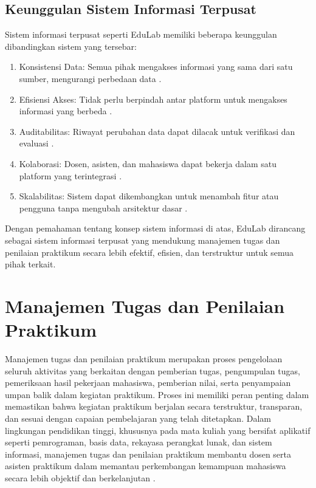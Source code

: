 \documentclass[12pt,a4paper,twoside]{report}
\begin{document}
\subsection{Keunggulan Sistem Informasi Terpusat}

Sistem informasi terpusat seperti EduLab memiliki beberapa keunggulan dibandingkan sistem yang tersebar:

\begin{enumerate}
    \item Konsistensi Data: Semua pihak mengakses informasi yang sama dari satu sumber, mengurangi perbedaan data \cite{stair2018}.
    \item Efisiensi Akses: Tidak perlu berpindah antar platform untuk mengakses informasi yang berbeda \cite{stair2018}.
    \item Auditabilitas: Riwayat perubahan data dapat dilacak untuk verifikasi dan evaluasi \cite{laudon2016}.
    \item Kolaborasi: Dosen, asisten, dan mahasiswa dapat bekerja dalam satu platform yang terintegrasi \cite{stair2018}.
    \item Skalabilitas: Sistem dapat dikembangkan untuk menambah fitur atau pengguna tanpa mengubah arsitektur dasar \cite{laudon2016}.
\end{enumerate}

Dengan pemahaman tentang konsep sistem informasi di atas, EduLab dirancang sebagai sistem informasi terpusat yang mendukung manajemen tugas dan penilaian praktikum secara lebih efektif, efisien, dan terstruktur untuk semua pihak terkait.

\section{Manajemen Tugas dan Penilaian Praktikum}

Manajemen tugas dan penilaian praktikum merupakan proses pengelolaan seluruh aktivitas yang berkaitan dengan pemberian tugas, pengumpulan tugas, pemeriksaan hasil pekerjaan mahasiswa, pemberian nilai, serta penyampaian umpan balik dalam kegiatan praktikum. Proses ini memiliki peran penting dalam memastikan bahwa kegiatan praktikum berjalan secara terstruktur, transparan, dan sesuai dengan capaian pembelajaran yang telah ditetapkan. Dalam lingkungan pendidikan tinggi, khususnya pada mata kuliah yang bersifat aplikatif seperti pemrograman, basis data, rekayasa perangkat lunak, dan sistem informasi, manajemen tugas dan penilaian praktikum membantu dosen serta asisten praktikum dalam memantau perkembangan kemampuan mahasiswa secara lebih objektif dan berkelanjutan \cite{ihantola2010}.
\end{document}
